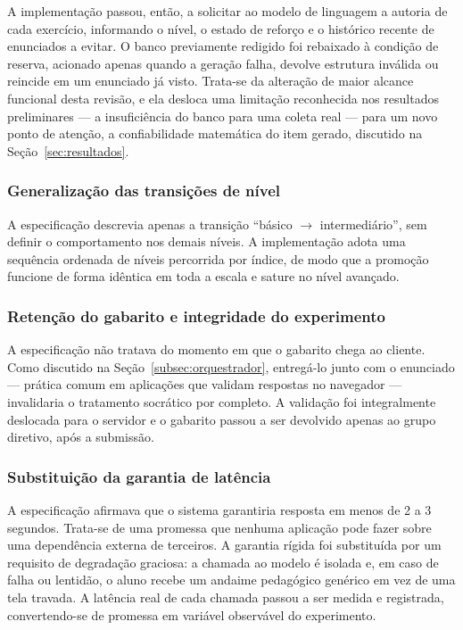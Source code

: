 \documentclass[10pt, a4paper, twocolumn]{article}
\begin{document}
A implementação passou, então, a solicitar ao modelo de linguagem a autoria de
cada exercício, informando o nível, o estado de reforço e o histórico recente de
enunciados a evitar. O banco previamente redigido foi rebaixado à condição de
reserva, acionado apenas quando a geração falha, devolve estrutura inválida ou
reincide em um enunciado já visto. Trata-se da alteração de maior alcance
funcional desta revisão, e ela desloca uma limitação reconhecida nos resultados
preliminares --- a insuficiência do banco para uma coleta real --- para um novo
ponto de atenção, a confiabilidade matemática do item gerado, discutido na
Seção~\ref{sec:resultados}.

\subsubsection{Generalização das transições de nível}

A especificação descrevia apenas a transição ``básico $\rightarrow$
intermediário'', sem definir o comportamento nos demais níveis. A implementação
adota uma sequência ordenada de níveis percorrida por índice, de modo que a
promoção funcione de forma idêntica em toda a escala e sature no nível avançado.

\subsubsection{Retenção do gabarito e integridade do experimento}

A especificação não tratava do momento em que o gabarito chega ao cliente. Como
discutido na Seção~\ref{subsec:orquestrador}, entregá-lo junto com o enunciado
--- prática comum em aplicações que validam respostas no navegador ---
invalidaria o tratamento socrático por completo. A validação foi integralmente
deslocada para o servidor e o gabarito passou a ser devolvido apenas ao grupo
diretivo, após a submissão.

\subsubsection{Substituição da garantia de latência}

A especificação afirmava que o sistema garantiria resposta em menos de 2 a 3
segundos. Trata-se de uma promessa que nenhuma aplicação pode fazer sobre uma
dependência externa de terceiros. A garantia rígida foi substituída por um
requisito de degradação graciosa: a chamada ao modelo é isolada e, em caso de
falha ou lentidão, o aluno recebe um andaime pedagógico genérico em vez de uma
tela travada. A latência real de cada chamada passou a ser medida e registrada,
convertendo-se de promessa em variável observável do experimento.
\end{document}
